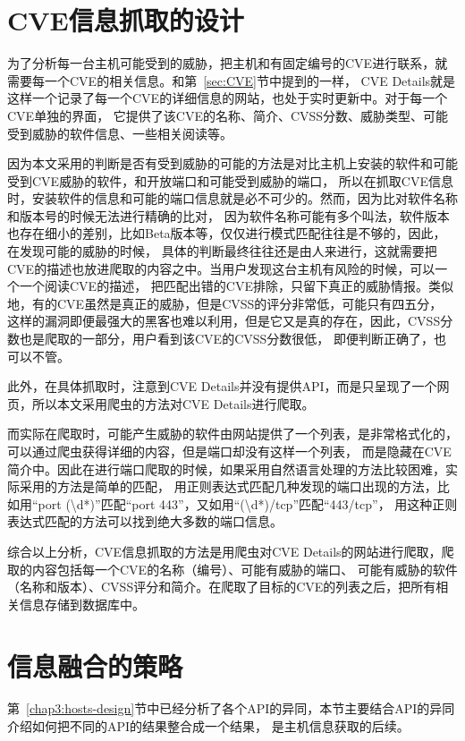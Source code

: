 \section{CVE信息抓取的设计}
\label{sec:CVE-strategy}

为了分析每一台主机可能受到的威胁，把主机和有固定编号的CVE进行联系，就需要每一个CVE的相关信息。和第~\ref{sec:CVE}节中提到的一样，
CVE Details就是这样一个记录了每一个CVE的详细信息的网站，也处于实时更新中。对于每一个CVE单独的界面，
它提供了该CVE的名称、简介、CVSS分数、威胁类型、可能受到威胁的软件信息、一些相关阅读等。

因为本文采用的判断是否有受到威胁的可能的方法是对比主机上安装的软件和可能受到CVE威胁的软件，和开放端口和可能受到威胁的端口，
所以在抓取CVE信息时，安装软件的信息和可能的端口信息就是必不可少的。然而，因为比对软件名称和版本号的时候无法进行精确的比对，
因为软件名称可能有多个叫法，软件版本也存在细小的差别，比如Beta版本等，仅仅进行模式匹配往往是不够的，因此，在发现可能的威胁的时候，
具体的判断最终往往还是由人来进行，这就需要把CVE的描述也放进爬取的内容之中。当用户发现这台主机有风险的时候，可以一个一个阅读CVE的描述，
把匹配出错的CVE排除，只留下真正的威胁情报。类似地，有的CVE虽然是真正的威胁，但是CVSS的评分非常低，可能只有四五分，
这样的漏洞即便最强大的黑客也难以利用，但是它又是真的存在，因此，CVSS分数也是爬取的一部分，用户看到该CVE的CVSS分数很低，
即便判断正确了，也可以不管。

此外，在具体抓取时，注意到CVE Details并没有提供API，而是只呈现了一个网页，所以本文采用爬虫的方法对CVE Details进行爬取。

而实际在爬取时，可能产生威胁的软件由网站提供了一个列表，是非常格式化的，可以通过爬虫获得详细的内容，但是端口却没有这样一个列表，
而是隐藏在CVE简介中。因此在进行端口爬取的时候，如果采用自然语言处理的方法比较困难，实际采用的方法是简单的匹配，
用正则表达式匹配几种发现的端口出现的方法，比如用“port (\textbackslash d*)”匹配“port 443”，又如用“(\textbackslash d*)/tcp”匹配“443/tcp”，
用这种正则表达式匹配的方法可以找到绝大多数的端口信息。

综合以上分析，CVE信息抓取的方法是用爬虫对CVE Details的网站进行爬取，爬取的内容包括每一个CVE的名称（编号）、可能有威胁的端口、
可能有威胁的软件（名称和版本）、CVSS评分和简介。在爬取了目标的CVE的列表之后，把所有相关信息存储到数据库中。

\section{信息融合的策略}
\label{sec:merge-strategy}

第~\ref{chap3:hosts-design}节中已经分析了各个API的异同，本节主要结合API的异同介绍如何把不同的API的结果整合成一个结果，
是主机信息获取的后续。

